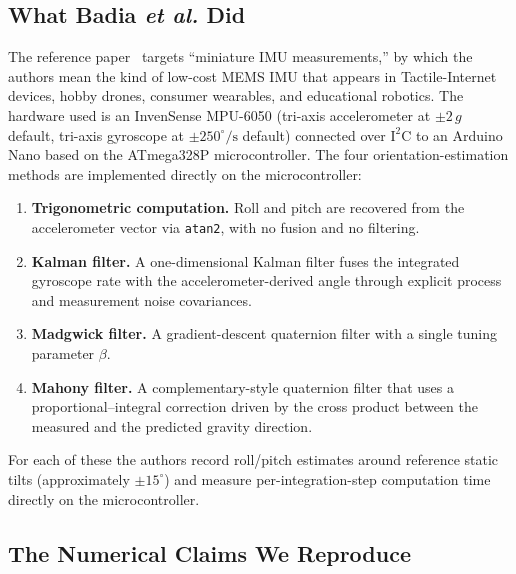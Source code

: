 \documentclass[conference]{IEEEtran}
\newcommand{\degr}{^{\circ}}
\begin{document}
\subsection{What Badia \textit{et al.} Did}

The reference paper~\cite{badia2023} targets ``miniature IMU
measurements,'' by which the authors mean the kind of low-cost
MEMS IMU that appears in Tactile-Internet devices, hobby drones,
consumer wearables, and educational robotics. The hardware used is
an InvenSense MPU-6050 (tri-axis accelerometer at $\pm 2\,g$
default, tri-axis gyroscope at $\pm 250\degr/\mathrm{s}$ default)
connected over $\mathrm{I}^2\mathrm{C}$ to an Arduino Nano based on
the ATmega328P microcontroller. The four orientation-estimation
methods are implemented directly on the microcontroller:
\begin{enumerate}
\item \textbf{Trigonometric computation.} Roll and pitch are
recovered from the accelerometer vector via \texttt{atan2}, with
no fusion and no filtering.
\item \textbf{Kalman filter.} A one-dimensional Kalman filter
fuses the integrated gyroscope rate with the accelerometer-derived
angle through explicit process and measurement noise covariances.
\item \textbf{Madgwick filter.} A gradient-descent quaternion
filter with a single tuning parameter $\beta$.
\item \textbf{Mahony filter.} A complementary-style quaternion
filter that uses a proportional--integral correction driven by the
cross product between the measured and the predicted gravity
direction.
\end{enumerate}
For each of these the authors record roll/pitch estimates around
reference static tilts (approximately $\pm 15\degr$) and measure
per-integration-step computation time directly on the
microcontroller.

\subsection{The Numerical Claims We Reproduce}
\end{document}

